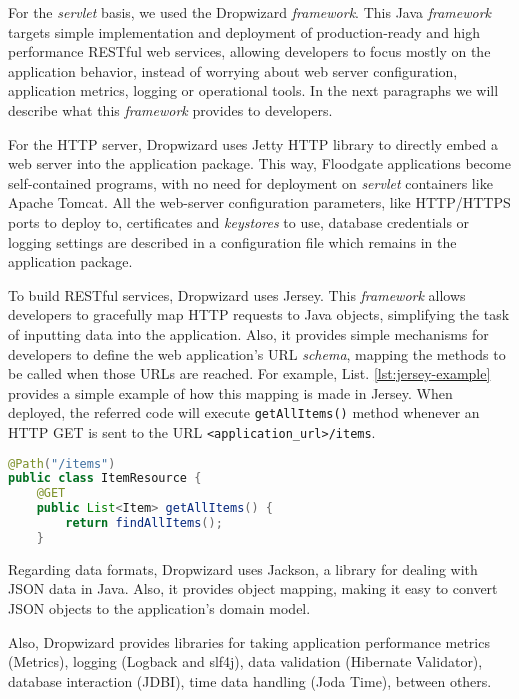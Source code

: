 For the \textit{servlet} basis, we used the Dropwizard \textit{framework}. This Java \textit{framework} targets simple implementation and deployment of production-ready and high performance RESTful web services, allowing developers to focus mostly on the application behavior, instead of worrying about web server configuration, application metrics, logging or operational tools. In the next paragraphs we will describe what this \textit{framework} provides to developers.

For the HTTP server, Dropwizard uses Jetty HTTP library to directly embed a web server into the application package. This way, Floodgate applications become self-contained programs, with no need for deployment on \textit{servlet} containers like Apache Tomcat. All the web-server configuration parameters, like HTTP/HTTPS ports to deploy to, certificates and \textit{keystores} to use, database credentials or logging settings are described in a configuration file which remains in the application package.

To build RESTful services, Dropwizard uses Jersey. This \textit{framework} allows developers to gracefully map HTTP requests to Java objects, simplifying the task of inputting data into the application. Also, it provides simple mechanisms for developers to define the web application's URL \textit{schema}, mapping the methods to be called when those URLs are reached. For example, List. \ref{lst:jersey-example} provides a simple example of how this mapping is made in Jersey. When deployed, the referred code will execute \texttt{getAllItems()} method whenever an HTTP GET is sent to the URL \texttt{<application\_url>/items}.

\newpage

\begin{lstlisting}[language=Java,caption=Jersey syntax example, label=lst:jersey-example]
@Path("/items")
public class ItemResource {
    @GET
    public List<Item> getAllItems() {
		return findAllItems();
    }
\end{lstlisting}

Regarding data formats, Dropwizard uses Jackson, a library for dealing with JSON data in Java. Also, it provides object mapping, making it easy to convert JSON objects to the application's domain model.

Also, Dropwizard provides libraries for taking application performance metrics (Metrics), logging (Logback and slf4j), data validation (Hibernate Validator), database interaction (JDBI), time data handling (Joda Time), between others.

